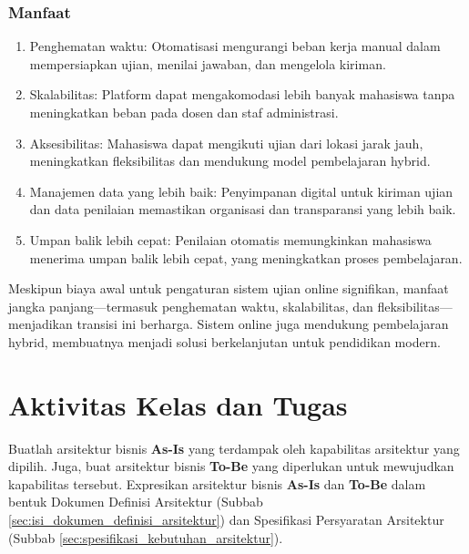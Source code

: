 \subsubsection{Manfaat}
\begin{enumerate}
	\item Penghematan waktu: Otomatisasi mengurangi beban kerja manual dalam mempersiapkan ujian, menilai jawaban, dan mengelola kiriman.
	\item Skalabilitas: Platform dapat mengakomodasi lebih banyak mahasiswa tanpa meningkatkan beban pada dosen dan staf administrasi.
	\item Aksesibilitas: Mahasiswa dapat mengikuti ujian dari lokasi jarak jauh, meningkatkan fleksibilitas dan mendukung model pembelajaran hybrid.
	\item Manajemen data yang lebih baik: Penyimpanan digital untuk kiriman ujian dan data penilaian memastikan organisasi dan transparansi yang lebih baik.
	\item Umpan balik lebih cepat: Penilaian otomatis memungkinkan mahasiswa menerima umpan balik lebih cepat, yang meningkatkan proses pembelajaran.
\end{enumerate}

Meskipun biaya awal untuk pengaturan sistem ujian online signifikan, manfaat jangka panjang—termasuk penghematan waktu, skalabilitas, dan fleksibilitas—menjadikan transisi ini berharga. Sistem online juga mendukung pembelajaran hybrid, membuatnya menjadi solusi berkelanjutan untuk pendidikan modern.


\section{Aktivitas Kelas dan Tugas}

Buatlah arsitektur bisnis \textbf{As-Is} yang terdampak oleh kapabilitas arsitektur yang dipilih. Juga, buat arsitektur bisnis \textbf{To-Be} yang diperlukan untuk mewujudkan kapabilitas tersebut. 
Expresikan arsitektur bisnis \textbf{As-Is} dan \textbf{To-Be} dalam bentuk Dokumen Definisi Arsitektur (Subbab \ref{sec:isi_dokumen_definisi_arsitektur}) dan Spesifikasi Persyaratan Arsitektur (Subbab \ref{sec:spesifikasi_kebutuhan_arsitektur}).

